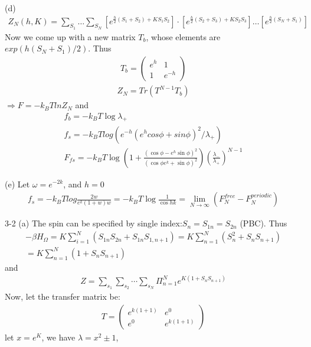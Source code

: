 \documentclass[12pt,titlepage]{article}
\numberwithin{equation}{section}
\begin{document}
(d)
\begin{align*}
    Z_{N}(h, K)=\sum_{S_{1}} \ldots \sum_{S_{N}}\left[e^{\frac{h}{2}\left(S_{1}+S_{2}\right)+K S_{1} S_{2}}\right] \cdot\left[e^{\frac{h}{2}\left(S_{2}+S_{3}\right)+K S_{2} S_{3}}\right] \ldots\left[e^{\frac{h}{2}\left(S_{N}+S_{1}\right)}\right]
\end{align*}
Now we come up with a new matrix $T_b$, whose elements are $exp(h(S_N+S_1)/2)$. Thus
\begin{align*}
    T_b=\left(\begin{array}{ll}{e^{h}} & {1} \\ {1} & {e^{-h}}\end{array}\right)
\end{align*}
\begin{align*}
    Z_N=Tr(T^{N-1}T_b)
\end{align*}
$\Rightarrow F=-k_BTlnZ_N$ and
\begin{align*}
    f_b=-k_{B} T \operatorname{log} \lambda_{+}\\
    f_s=-k_{B} T log\left(e^{-h}(e^h cos\phi+sin\phi)^2/\lambda_+\right)\\
    F_{fs}=-k_B T \log\left(1+\frac{\left(\cos \phi-e^{h} \sin \phi\right)^{2}}{\left(\cos \phi e^{k}+\sin \phi\right)^{2} }\right)\left(\frac{\lambda_-}{\lambda_+}\right)^{N-1}
\end{align*}

(e) Let $\omega=e^{-2 k}$, and $h=0$
\begin{align*}
    f_s=-k_BTlog\frac{2 w}{e^{k}(1+w) w}= -k_{B} T \log \frac{1}{\cos h k}= \lim_{N\rightarrow\infty}(F_N^{free}-F_{N}^{periodic})
\end{align*}

3-2 (a) The spin can be specified by single index:$S_{n}=S_{1 n}=S_{2 n}$ (PBC).
Thus
\begin{align*}
    -\beta H_{\Omega}=K \sum_{i=1}^{N}\left(S_{1 n} S_{2 n}+S_{1n}S_{1,n+1}\right)=K \sum_{n=1}^{N}\left(S_{n}^{2}+S_{n} S_{n+1}\right)\\=K \sum_{n=1}^{N}\left(1+S_{n} S_{n+1}\right)
\end{align*}
and 
\begin{align*}
    Z=\sum_{s_{1}} \sum_{s_{2}} \cdots \sum_{s_{N}}\Pi_{n=1}^{N}e^{K(1+S_nS_{n+1})}
\end{align*}
Now, let the transfer matrix be:
\begin{align*}
    T=\left(\begin{array}{cc}{e^{k(1+1)}} & {e^{0}} \\ {e^{0}} & {e^{k(1+1)}}\end{array}\right)
\end{align*}
let $x=e^K$, we have $\lambda=x^{2} \pm 1$,
\end{document}
